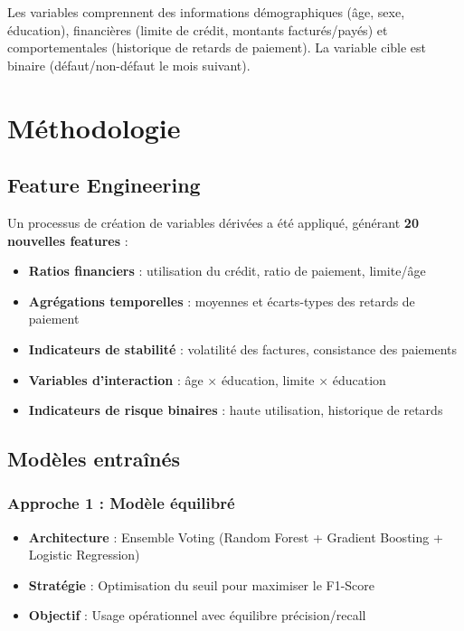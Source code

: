 \documentclass[11pt,a4paper]{article}
\begin{document}
Les variables comprennent des informations démographiques (âge, sexe, éducation), financières (limite de crédit, montants facturés/payés) et comportementales (historique de retards de paiement). La variable cible est binaire (défaut/non-défaut le mois suivant).

\section{Méthodologie}

\subsection{Feature Engineering}

Un processus de création de variables dérivées a été appliqué, générant \textbf{20 nouvelles features} :
\begin{itemize}
    \item \textbf{Ratios financiers} : utilisation du crédit, ratio de paiement, limite/âge
    \item \textbf{Agrégations temporelles} : moyennes et écarts-types des retards de paiement
    \item \textbf{Indicateurs de stabilité} : volatilité des factures, consistance des paiements
    \item \textbf{Variables d'interaction} : âge × éducation, limite × éducation
    \item \textbf{Indicateurs de risque binaires} : haute utilisation, historique de retards
\end{itemize}

\subsection{Modèles entraînés}

\subsubsection{Approche 1 : Modèle équilibré}
\begin{itemize}
    \item \textbf{Architecture} : Ensemble Voting (Random Forest + Gradient Boosting + Logistic Regression)
    \item \textbf{Stratégie} : Optimisation du seuil pour maximiser le F1-Score
    \item \textbf{Objectif} : Usage opérationnel avec équilibre précision/recall
\end{itemize}
\end{document}

